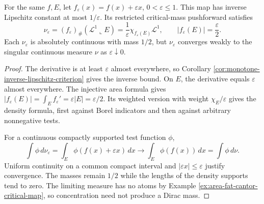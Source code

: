 \begin{proposition}\label{prop:fat-cantor-regularized-critical-density}
For the same $f,E$, let $f_\varepsilon(x)=f(x)+\varepsilon x$, $0<\varepsilon\leq1$. This map has inverse Lipschitz constant at most $1/\varepsilon$. Its restricted critical-mass pushforward satisfies
\[
 \nu_\varepsilon=(f_\varepsilon)_\#(\mathcal L^1\llcorner E)
 =\frac1\varepsilon\chi_{f_\varepsilon(E)}\mathcal L^1,
 \qquad |f_\varepsilon(E)|=\frac\varepsilon2.
\]
Each $\nu_\varepsilon$ is absolutely continuous with mass $1/2$, but $\nu_\varepsilon$ converges weakly to the singular continuous measure $\nu$ as $\varepsilon\downarrow0$.
\end{proposition}
\begin{proof}
The derivative is at least $\varepsilon$ almost everywhere, so Corollary \ref{cor:monotone-inverse-lipschitz-criterion} gives the inverse bound. On $E$, the derivative equals $\varepsilon$ almost everywhere. The injective area formula gives $|f_\varepsilon(E)|=\int_Ef_\varepsilon'=\varepsilon|E|=\varepsilon/2$. Its weighted version with weight $\chi_E/\varepsilon$ gives the density formula, first against Borel indicators and then against arbitrary nonnegative tests.

For a continuous compactly supported test function $\phi$,
\[
 \int\phi\,d\nu_\varepsilon=\int_E\phi(f(x)+\varepsilon x)\,dx
 \longrightarrow\int_E\phi(f(x))\,dx=\int\phi\,d\nu.
\]
Uniform continuity on a common compact interval and $|\varepsilon x|\leq\varepsilon$ justify convergence. The masses remain $1/2$ while the lengths of the density supports tend to zero. The limiting measure has no atoms by Example \ref{ex:area-fat-cantor-critical-map}, so concentration need not produce a Dirac mass.
\end{proof}

